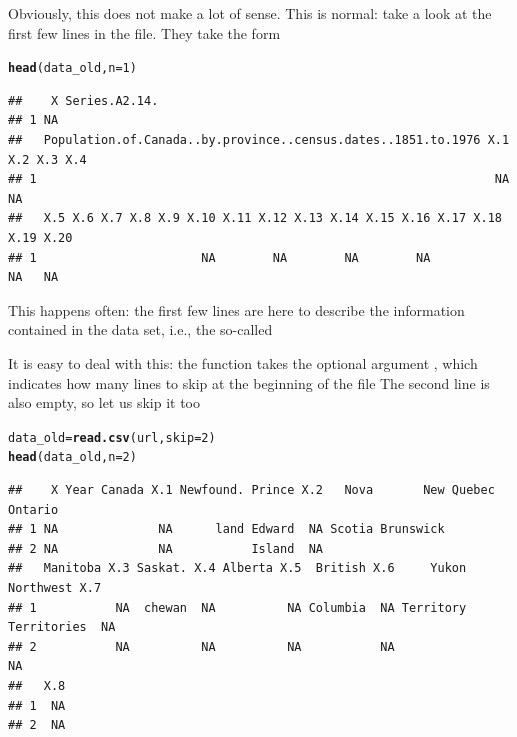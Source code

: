 \documentclass[aspectratio=169]{beamer}\usepackage[]{graphicx}\usepackage[]{xcolor}
\makeatletter
\newcommand{\hlnum}[1]{\textcolor[rgb]{0.686,0.059,0.569}{#1}}%
\newcommand{\hldef}[1]{\textcolor[rgb]{0.345,0.345,0.345}{#1}}%
\newcommand{\hlkwb}[1]{\textcolor[rgb]{0.69,0.353,0.396}{#1}}%
\newcommand{\hlkwc}[1]{\textcolor[rgb]{0.333,0.667,0.333}{#1}}%
\newcommand{\hlkwd}[1]{\textcolor[rgb]{0.737,0.353,0.396}{\textbf{#1}}}%
\newenvironment{kframe}{%
 \def\at@end@of@kframe{}%
 \ifinner\ifhmode%
  \def\at@end@of@kframe{\end{minipage}}%
  \begin{minipage}{\columnwidth}%
 \fi\fi%
 \def\FrameCommand##1{\hskip\@totalleftmargin \hskip-\fboxsep
 \colorbox{shadecolor}{##1}\hskip-\fboxsep
     \hskip-\linewidth \hskip-\@totalleftmargin \hskip\columnwidth}%
 \MakeFramed {\advance\hsize-\width
   \@totalleftmargin\z@ \linewidth\hsize
   \@setminipage}}%
 {\par\unskip\endMakeFramed%
 \at@end@of@kframe}
\newenvironment{knitrout}{}{} %
\makeatother
\begin{document}
\begin{frame}[fragile]
Obviously, this does not make a lot of sense. This is normal: take a look at the first few lines in the file. They take the form
\begin{knitrout}
\color{fgcolor}\begin{kframe}
\begin{alltt}
\hlkwd{head}\hldef{(data_old,} \hlkwc{n} \hldef{=} \hlnum{1}\hldef{)}
\end{alltt}
\begin{verbatim}
##    X Series.A2.14.
## 1 NA              
##   Population.of.Canada..by.province..census.dates..1851.to.1976 X.1 X.2 X.3 X.4
## 1                                                                NA          NA
##   X.5 X.6 X.7 X.8 X.9 X.10 X.11 X.12 X.13 X.14 X.15 X.16 X.17 X.18 X.19 X.20
## 1                       NA        NA        NA        NA             NA   NA
\end{verbatim}
\end{kframe}
\end{knitrout}
\vfill
This happens often: the first few lines are here to describe the information contained in the data set, i.e., the so-called 
\end{frame}

\begin{frame}[fragile]
It is easy to deal with this: the function  takes the optional argument , which indicates how many lines to skip at the beginning of the file
\vfill
The second line is also empty, so let us skip it too

\begin{knitrout}
\color{fgcolor}\begin{kframe}
\begin{alltt}
\hldef{data_old} \hlkwb{=} \hlkwd{read.csv}\hldef{(url,} \hlkwc{skip} \hldef{=} \hlnum{2}\hldef{)}
\hlkwd{head}\hldef{(data_old,} \hlkwc{n} \hldef{=} \hlnum{2}\hldef{)}
\end{alltt}
\begin{verbatim}
##    X Year Canada X.1 Newfound. Prince X.2   Nova       New Quebec Ontario
## 1 NA              NA      land Edward  NA Scotia Brunswick               
## 2 NA              NA           Island  NA                                
##   Manitoba X.3 Saskat. X.4 Alberta X.5  British X.6     Yukon   Northwest X.7
## 1           NA  chewan  NA          NA Columbia  NA Territory Territories  NA
## 2           NA          NA          NA           NA                        NA
##   X.8
## 1  NA
## 2  NA
\end{verbatim}
\end{kframe}
\end{knitrout}
\end{frame}
\end{document}
